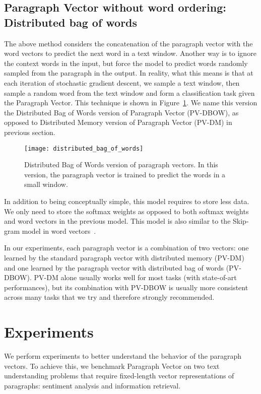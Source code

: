 \documentclass{article}
\begin{document}
\subsection{Paragraph Vector without word ordering: Distributed bag of words}

The above method considers the concatenation of the paragraph vector
with the word vectors to predict the next word in a text
window. Another way is to ignore the context words in the input, but
force the model to predict words randomly sampled from the paragraph
in the output. In reality, what this means is that at each iteration
of stochastic gradient descent, we sample a text window, then sample a
random word from the text window and form a classification task given
the Paragraph Vector. This technique is shown in
Figure~\ref{fig:lm3}. We name this version the Distributed Bag of
Words version of Paragraph Vector (PV-DBOW), as opposed to Distributed
Memory version of Paragraph Vector (PV-DM) in previous section.

\begin{figure}[htb]
\texttt{[image: distributed\_bag\_of\_words]}
\caption{Distributed Bag of Words version of paragraph vectors. In
  this version, the paragraph vector is trained to predict the words
  in a small window.}
\label{fig:lm3}
\end{figure}

In addition to being conceptually simple, this model requires to store
less data. We only need to store the softmax weights as opposed to
both softmax weights and word vectors in the previous model. This
model is also similar to the Skip-gram model in word
vectors~\cite{phrases0}.

In our experiments, each paragraph vector is a combination of two
vectors: one learned by the standard paragraph vector with distributed
memory (PV-DM) and one learned by the paragraph vector with
distributed bag of words (PV-DBOW). PV-DM alone usually works well for
most tasks (with state-of-art performances), but its combination with
PV-DBOW is usually more consistent across many tasks that we try and
therefore strongly recommended.

\section{Experiments}
We perform experiments to better understand the behavior of the
paragraph vectors. To achieve this, we benchmark Paragraph Vector on
two text understanding problems that require fixed-length vector
representations of paragraphs: sentiment analysis and information
retrieval.
\end{document}
